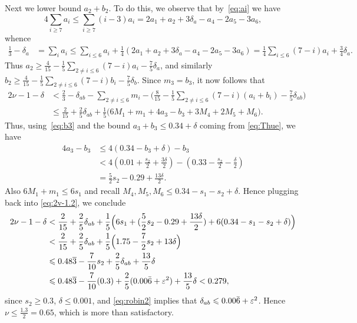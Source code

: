Next we lower bound $a_2+b_2$. To do this, we observe that by~\eqref{eq:ai} we have
$$
4\sum_{i\ge7} a_i \le \sum_{i\ge7}(i-3)a_i = 2a_1+a_2+3\delta_a -a_4-2a_5-3a_6,
$$
whence
\begin{align*}
\frac{1}{3} -\delta_a&= \sum_{i}a_i
\le \sum_{i\le 6}a_i +\frac{1}{4}(2a_1+a_2+3\delta_a -a_4-2a_5-3a_6)
= \frac{1}{4}\sum_{i\le 6}(7-i)a_i +\frac{3}{4}\delta_a.
\end{align*}
Thus $a_2 \ge \frac{4}{15} -  \frac{1}{5}\sum_{2\neq i\le 6}(7-i)a_i-\frac{7}{5}\delta_a$,
and similarly $b_2 \ge \frac{4}{15} -  \frac{1}{5}\sum_{2\neq i\le 6}(7-i)b_i-\frac{7}{5}\delta_b$. Since $m_3=b_3$, it
now follows that
\begin{align}\label{eq:2v-1.2}
2\nu -1-\delta
&<  \frac{2}{3}-\delta_{ab} -\sum_{2\neq i \le 6}m_i  - \Big(\frac{8}{15} -  \frac{1}{5}\sum_{2\neq i \le 6}(7-i)(a_i+b_i)-\frac{7}{5}\delta_{ab}\Big)  \nonumber\\
& \le \frac{2}{15} +\frac{2}{5}\delta_{ab}+ \frac{1}{5}\Big(6M_1+m_1 + 4a_3-b_3 +3M_4+2M_5+ M_6\Big).
\end{align}
 Thus, using~\eqref{eq:b3} and the bound $a_3+b_3\leq 0.34+\delta$ coming from \eqref{eq:Thue}, we have
\begin{align*}
4a_3-b_3 &\le 4(0.34-b_3+\delta)-b_3 \\
&< 4(0.01+\frac{s_2}{2}+\frac{3\delta}{2}) - (0.33-\frac{s_2}{2}-\frac{\delta}{2})\\
& = \frac{5}{2}s_2-0.29+\frac{13\delta}{2}.
\end{align*}
Also $6M_1+m_1\le 6s_1$ and recall $M_4,M_5,M_6 \le
0.34-s_1-s_2+\delta$.
Hence plugging back into \eqref{eq:2v-1.2}, we conclude
\begin{align*}
2\nu -1-\delta
& < \frac{2}{15}+
\frac{2}{5}\delta_{ab}
+ \frac{1}{5}\Big(6s_1 + (\frac{5}{2}s_2-0.29+\frac{13\delta}{2})+6(0.34-s_1-s_2+\delta)\Big)\\
& < \frac{2}{15}+
\frac{2}{5}\delta_{ab}
+ \frac{1}{5}\Big(1.75-\frac{7}{2}s_2+13\delta\Big)\\
& \leqslant  0.48\overline{3}  - \frac{7}{10}s_2 +\frac{2}{5}\delta_{ab} +\frac{13}{5}\delta \\
&\leqslant  0.48\overline{3}  - \frac{7}{10}(0.3) +\frac{2}{5}(0.00\bar{6}+\varepsilon^2) +\frac{13}{5}\delta< 0.279,
\end{align*}
since $s_2\geq 0.3$, $\delta\le 0.001$, and \eqref{eq:robin2} implies that $\delta_{ab}\leqslant 0.00\bar{6}+\varepsilon^2$.
Hence $\nu\le \frac{1.3}{2} = 0.65$, which is more than satisfactory.




